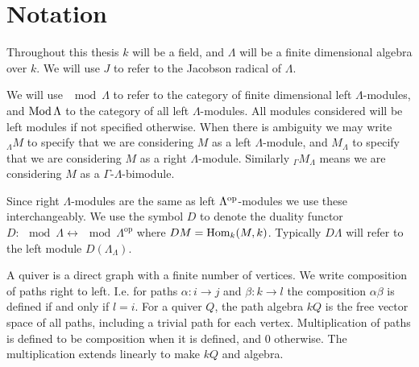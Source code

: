 \section*{Notation}
%
Throughout this thesis $k$ will be a field, and $\Lambda$ will be a finite dimensional algebra over $k$. We will use $J$ to refer to the Jacobson radical of $\Lambda$.


We will use $\mod\Lambda$ to refer to the category of finite dimensional left $\Lambda$-modules, and $\operatorname{Mod}\Lambda$ to the category of all left $\Lambda$-modules. All modules considered will be left modules if not specified otherwise. When there is ambiguity we may write $_\Lambda M$ to specify that we are considering $M$ as a left $\Lambda$-module, and $M_\Lambda$ to specify that we are considering $M$ as a right $\Lambda$-module. Similarly $_\Gamma M_\Lambda$ means we are considering $M$ as a $\Gamma$-$\Lambda$-bimodule.


Since right $\Lambda$-modules are the same as left $\Lambda^{\operatorname{op}}$-modules we use these interchangeably. We use the symbol $D$ to denote the duality functor $D\colon \mod \Lambda \leftrightarrow \mod\Lambda^{\operatorname{op}}$ where $DM = \operatorname{Hom}_k(M, k)$. Typically $D\Lambda$ will refer to the left module $D(\Lambda_\Lambda)$.


A quiver is a direct graph with a finite number of vertices. We write composition of paths right to left. I.e. for paths $\alpha\colon i \to j$ and $\beta\colon k\to l$ the composition $\alpha\beta$ is defined if and only if $l=i$. For a quiver $Q$, the path algebra $kQ$ is the free vector space of all paths, including a trivial path for each vertex. Multiplication of paths is defined to be composition when it is defined, and 0 otherwise. The multiplication extends linearly to make $kQ$ and algebra.


